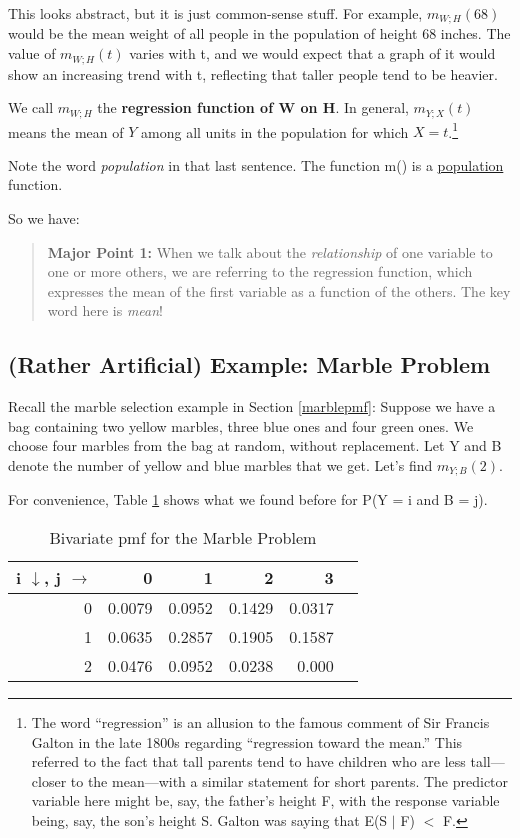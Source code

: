This looks abstract, but it is just common-sense stuff.  For example,
$m_{W;H}(68)$ would be the mean weight of all people in the population
of height 68 inches.  The value of $m_{W;H}(t)$ varies with t, and we
would expect that a graph of it would show an increasing trend with t,
reflecting that taller people tend to be heavier.  

We call $m_{W;H}$ the {\bf regression function of W on H}.  In general,
$m_{Y;X}(t)$ means the mean of $Y$ among all units in the population for
which $X = t$.\footnote{The word ``regression'' is an allusion to the
famous comment of Sir Francis Galton in the late 1800s regarding
``regression toward the mean.''  This referred to the fact that tall
parents tend to have children who are less tall---closer to the
mean---with a similar statement for short parents.  The predictor
variable here might be, say, the father's height F, with the response
variable being, say, the son's height S.  Galton was saying that 
E(S $|$ F) $<$ F.}

Note the word {\it population} in that last sentence.  The function m()
is a \underline{population} function.

So we have:

\begin{quote}
{\bf Major Point 1:} When we talk about the {\it relationship} of one
variable to one or more others, we are referring to the regression function,
which expresses the mean of the first variable as a function of the
others.  The key word here is {\it mean}!
\end{quote}

\subsection{(Rather Artificial) Example:  Marble Problem}

Recall the marble selection example in Section \ref{marblepmf}:  Suppose
we have a bag containing two yellow marbles, three blue ones and four
green ones.  We choose four marbles from the bag at random, without
replacement.  Let Y and B denote the number of yellow and blue marbles
that we get.  Let's find  $m_{Y;B}(2)$.

For convenience, Table \ref{marblepmf1} shows what we found before for P(Y = i and B = j).

\begin{table}
\vskip 0.5in
\vskip 0.5in
\begin{center}
\begin{tabular}{|r|r|r|r|r|r|}
\hline
i $\downarrow$, j $\rightarrow$ & 0 & 1 & 2 & 3 \\ \hline
0 & 0.0079 & 0.0952 & 0.1429 & 0.0317 \\ \hline
1 & 0.0635 & 0.2857 & 0.1905 & 0.1587 \\ \hline
2 & 0.0476 & 0.0952 & 0.0238 & 0.000 \\ \hline
\end{tabular}
\end{center}
\caption{Bivariate pmf for the Marble Problem}
\label{marblepmf1}
\end{table}


